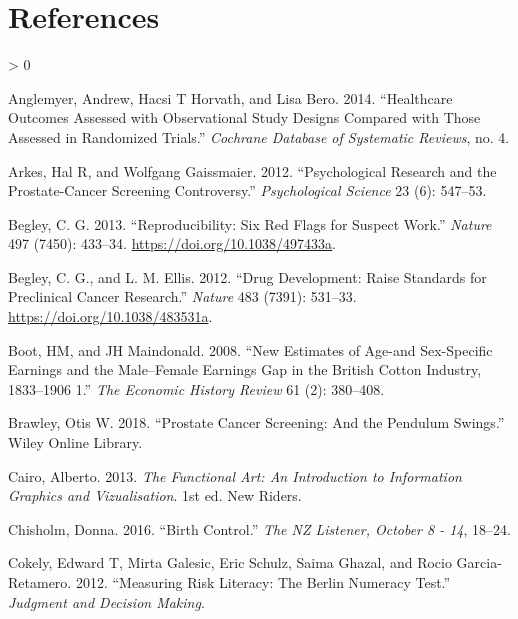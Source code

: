 \documentclass[
  10pt,
  b5paper]{book}
\newlength{\cslhangindent}
\newenvironment{CSLReferences}[2] %
 {%
  \setlength{\parindent}{0pt}
  \ifodd #1 \everypar{\setlength{\hangindent}{\cslhangindent}}\ignorespaces\fi
  \ifnum #2 > 0
  \setlength{\parskip}{#2\baselineskip}
  \fi
 }%
 {}
\begin{document}
\hypertarget{references}{%
\chapter*{References}\label{references}}

\hypertarget{refs}{}
\begin{CSLReferences}{1}{0}
\leavevmode\hypertarget{ref-anglemyer2014healthcare}{}%
Anglemyer, Andrew, Hacsi T Horvath, and Lisa Bero. 2014. {``Healthcare Outcomes Assessed with Observational Study Designs Compared with Those Assessed in Randomized Trials.''} \emph{Cochrane Database of Systematic Reviews}, no. 4.

\leavevmode\hypertarget{ref-arkes2012psychological}{}%
Arkes, Hal R, and Wolfgang Gaissmaier. 2012. {``Psychological Research and the Prostate-Cancer Screening Controversy.''} \emph{Psychological Science} 23 (6): 547--53.

\leavevmode\hypertarget{ref-r2_begley_2013}{}%
Begley, C. G. 2013. {``Reproducibility: Six Red Flags for Suspect Work.''} \emph{Nature} 497 (7450): 433--34. \url{https://doi.org/10.1038/497433a}.

\leavevmode\hypertarget{ref-r23_begley_ellis_2012}{}%
Begley, C. G., and L. M. Ellis. 2012. {``Drug Development: Raise Standards for Preclinical Cancer Research.''} \emph{Nature} 483 (7391): 531--33. \url{https://doi.org/10.1038/483531a}.

\leavevmode\hypertarget{ref-boot2008new}{}%
Boot, HM, and JH Maindonald. 2008. {``New Estimates of Age-and Sex-Specific Earnings and the Male--Female Earnings Gap in the British Cotton Industry, 1833--1906 1.''} \emph{The Economic History Review} 61 (2): 380--408.

\leavevmode\hypertarget{ref-brawley2018prostate}{}%
Brawley, Otis W. 2018. {``Prostate Cancer Screening: And the Pendulum Swings.''} Wiley Online Library.

\leavevmode\hypertarget{ref-cairo_2013}{}%
Cairo, Alberto. 2013. \emph{The Functional Art: An Introduction to Information Graphics and Vizualisation}. 1st ed. New Riders.

\leavevmode\hypertarget{ref-chisholm_2016}{}%
Chisholm, Donna. 2016. {``Birth Control.''} \emph{The NZ Listener, October 8 - 14}, 18--24.

\leavevmode\hypertarget{ref-cokely2012measuring}{}%
Cokely, Edward T, Mirta Galesic, Eric Schulz, Saima Ghazal, and Rocio Garcia-Retamero. 2012. {``Measuring Risk Literacy: The Berlin Numeracy Test.''} \emph{Judgment and Decision Making}.


\end{CSLReferences}
\end{document}
